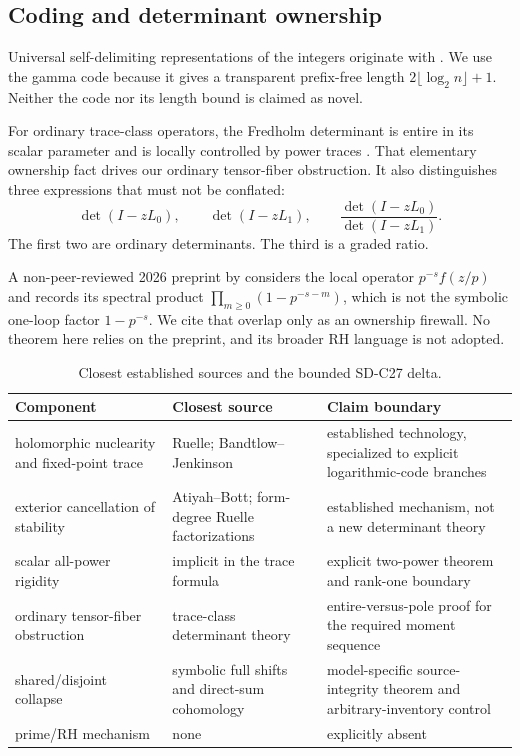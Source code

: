 \subsection{Coding and determinant ownership}

Universal self-delimiting representations of the integers originate with
\citet{Elias1975}.  We use the gamma code because it gives a transparent
prefix-free length \(2\lfloor\log_2n\rfloor+1\).  Neither the code nor its
length bound is claimed as novel.

For ordinary trace-class operators, the Fredholm determinant is entire in
its scalar parameter and is locally controlled by power traces
\citep{Simon1977}.  That elementary ownership fact drives our ordinary
tensor-fiber obstruction.  It also distinguishes three expressions that
must not be conflated:
\[
 \det(I-zL_0),\qquad
 \det(I-zL_1),\qquad
 \frac{\det(I-zL_0)}{\det(I-zL_1)}.
\]
The first two are ordinary determinants.  The third is a graded ratio.

A non-peer-reviewed 2026 preprint by \citet{Randolph2026} considers the
local operator \(p^{-s}f(z/p)\) and records its spectral product
\(\prod_{m\ge0}(1-p^{-s-m})\), which is not the symbolic one-loop factor
\(1-p^{-s}\).  We cite that overlap only as an ownership firewall.  No
theorem here relies on the preprint, and its broader RH language is not
adopted.

\begin{table}[t]
\centering
\caption{Closest established sources and the bounded SD-C27 delta.}
\label{tab:novelty}
\small
\begin{tabularx}{\textwidth}{L{3.4cm}L{3.6cm}Y}
\toprule
Component & Closest source & Claim boundary \\
\midrule
holomorphic nuclearity and fixed-point trace
& Ruelle; Bandtlow--Jenkinson
& established technology, specialized to explicit logarithmic-code branches \\
exterior cancellation of stability
& Atiyah--Bott; form-degree Ruelle factorizations
& established mechanism, not a new determinant theory \\
scalar all-power rigidity
& implicit in the trace formula
& explicit two-power theorem and rank-one boundary \\
ordinary tensor-fiber obstruction
& trace-class determinant theory
& entire-versus-pole proof for the required moment sequence \\
shared/disjoint collapse
& symbolic full shifts and direct-sum cohomology
& model-specific source-integrity theorem and arbitrary-inventory control \\
prime/RH mechanism
& none
& explicitly absent \\
\bottomrule
\end{tabularx}
\end{table}

